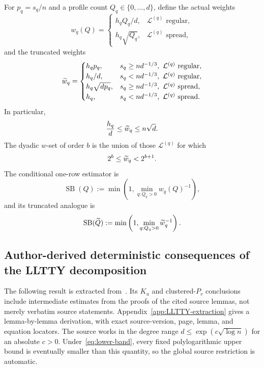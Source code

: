 For $p_q=s_q/n$ and a profile count $Q_q\in\{0,\ldots,d\}$, define the actual weights
\begin{equation}\label{eq:actual-weights}
  w_q(Q)=
  \begin{cases}
    h_qQ_q/d,&\mathcal L^{(q)}\text{ regular},\\
    h_q\sqrt{Q_q},&\mathcal L^{(q)}\text{ spread},
  \end{cases}
\end{equation}
and the truncated weights
\begin{equation}\label{eq:truncated-weights}
  \widetilde w_q=
  \begin{cases}
    h_qp_q,&s_q\ge nd^{-1/3},\ \mathcal L^{(q)}\text{ regular},\\
    h_q/d,&s_q<nd^{-1/3},\ \mathcal L^{(q)}\text{ regular},\\
    h_q\sqrt{dp_q},&s_q\ge nd^{-1/3},\ \mathcal L^{(q)}\text{ spread},\\
    h_q,&s_q<nd^{-1/3},\ \mathcal L^{(q)}\text{ spread}.
  \end{cases}
\end{equation}
In particular,
\begin{equation}\label{eq:weight-range}
  \frac{h_q}{d}\le\widetilde w_q\le n\sqrt d.
\end{equation}
The dyadic $w$-set of order $b$ is the union of those $\mathcal L^{(q)}$ for which
\[
  2^b\le\widetilde w_q<2^{b+1}.
\]
The conditional one-row estimator is
\begin{equation}\label{eq:SB-actual}
  \operatorname{SB}(Q):=\min\left(1,\min_{q:Q_q>0}w_q(Q)^{-1}\right),
\end{equation}
and its truncated analogue is
\begin{equation}\label{eq:SB-truncated}
  \operatorname{SB}(\widetilde Q):=\min\left(1,\min_{q:Q_q>0}\widetilde w_q^{-1}\right).
\end{equation}

\subsection{Author-derived deterministic consequences of the LLTTY decomposition}

The following result is extracted from~\cite[Lemmas~5.1, 5.4, 5.5, 7.2, 7.7--7.9 and Theorem~5.6]{LLTTY19}. Its $K_u$ and clustered-$P_v$ conclusions include intermediate estimates from the proofs of the cited source lemmas, not merely verbatim source statements. Appendix~\ref{app:LLTTY-extraction} gives a lemma-by-lemma derivation, with exact source-version, page, lemma, and equation locators. The source works in the degree range $d\le\exp(c\sqrt{\log n})$ for an absolute $c>0$. Under~\eqref{eq:lower-band}, every fixed polylogarithmic upper bound is eventually smaller than this quantity, so the global source restriction is automatic.

